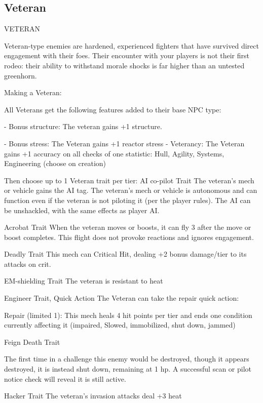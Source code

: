 \subsection{Veteran}
                                                   VETERAN

Veteran-type enemies are hardened, experienced fighters that have survived direct engagement
with their foes. Their encounter with your players is not their first rodeo: their ability to withstand
morale shocks is far higher than an untested greenhorn.


Making a Veteran:

All Veterans get the following features added to their base NPC type:

     -   Bonus structure: The veteran gains +1 structure.

     -   Bonus stress: The Veteran gains +1 reactor stress
     -   Veterancy: The Veteran gains +1 accuracy on all checks of one statistic: Hull, Agility,
         Systems, Engineering (choose on creation)

Then choose up to 1 Veteran trait per tier:
AI co-pilot
Trait
The veteran's mech or vehicle gains the AI tag. The veteran's mech or vehicle is autonomous and
can function even if the veteran is not piloting it (per the player rules). The AI can be unshackled,
with the same effects as player AI.


Acrobat
Trait
When the veteran moves or boosts, it can fly 3 after the move or boost completes. This flight
does not provoke reactions and ignores engagement.


Deadly
Trait
This mech can Critical Hit, dealing +2 bonus damage/tier to its attacks on crit.


EM-shielding
Trait
The veteran is resistant to heat


Engineer
Trait, Quick Action
The Veteran can take the repair quick action:

         Repair (limited 1): This mech heals 4 hit points per tier and ends one condition currently
         affecting it (impaired, Slowed, immobilized, shut down, jammed)


Feign Death
Trait




The first time in a challenge this enemy would be destroyed, though it appears destroyed, it is
instead shut down, remaining at 1 hp. A successful scan or pilot notice check will reveal it is still
active.


Hacker
Trait
The veteran's invasion attacks deal +3 heat


